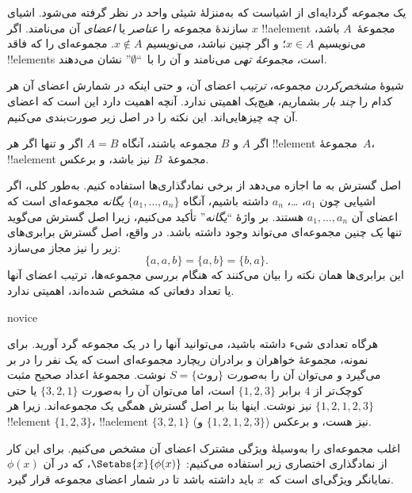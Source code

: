 \documentclass[../../../include/open-logic-section]{subfiles}
\begin{document}

یک \emph{مجموعه} گردایه‌ای از اشیاست که {به‌منزلهٔ} شیئی واحد در
نظر گرفته می‌شود. اشیای سازندهٔ مجموعه را \emph{عناصر} یا
\emph{اعضای} آن می‌نامند. اگر $x$ !!a{element} مجموعهٔ~$A$ باشد،
می‌نویسیم $x \in A$؛ و اگر چنین نباشد، می‌نویسیم $x \notin A$.
مجموعه‌ای را که فاقد !!{element}s است، \emph{مجموعهٔ تهی} می‌نامند و
آن را با~``$\emptyset$'' نشان می‌دهند.

\begin{explain}
شیوهٔ \emph{مشخص‌کردن} مجموعه، \emph{ترتیب} اعضای آن، و حتی
اینکه در شمارش اعضای آن هر کدام را \emph{چند بار} بشماریم،
هیچ‌یک اهمیتی ندارد. آنچه اهمیت دارد این است که اعضای آن چه
چیزهایی‌اند. این نکته را در اصل زیر صورت‌بندی می‌کنیم.
\end{explain}

\begin{defn}
  اگر $A$ و $B$ مجموعه باشند، آنگاه $A = B$ اگر و تنها اگر
  هر !!{element} مجموعهٔ~$A$، !!a{element} مجموعهٔ~$B$ نیز باشد، و
  برعکس.
\end{defn}

اصل گسترش به ما اجازه می‌دهد از برخی نمادگذاری‌ها استفاده کنیم.
به‌طور کلی، اگر اشیایی چون $a_{1}$، \dots، $a_{n}$ داشته باشیم، آنگاه
$\{a_{1}, \dots, a_{n}\}$ \emph{یگانه} مجموعه‌ای است که اعضای آن
$a_1, \ldots, a_n$ هستند. بر واژهٔ ``\emph{یگانه}'' تأکید می‌کنیم،
زیرا اصل گسترش می‌گوید تنها \emph{یک} چنین مجموعه‌ای می‌تواند وجود
داشته باشد. در واقع، اصل گسترش برابری‌های زیر را نیز مجاز می‌سازد:
  \[
    \{a, a, b\} = \{a, b\} = \{b,a\}.
  \]
این برابری‌ها همان نکته را بیان می‌کنند که هنگام بررسی مجموعه‌ها،
ترتیب اعضای آنها یا تعداد دفعاتی که مشخص شده‌اند، اهمیتی ندارد.

\begin{tagblock}{novice}
\begin{ex}
هرگاه تعدادی شیء داشته باشید، می‌توانید آنها را در یک مجموعه گرد آورید.
برای نمونه، مجموعهٔ خواهران و برادران ریچارد مجموعه‌ای است که یک نفر را
در بر می‌گیرد و می‌توان آن را به‌صورت $S=\{\textrm{روث}\}$ نوشت.
مجموعهٔ اعداد صحیح مثبت کوچک‌تر از $4$ برابر $\{1, 2, 3\}$ است، اما
می‌توان آن را به‌صورت $\{3, 2, 1\}$ یا حتی $\{1, 2, 1, 2, 3\}$ نیز نوشت.
اینها بنا بر اصل گسترش همگی یک مجموعه‌اند. زیرا هر !!{element}
$\{1, 2, 3\}$، !!a{element} $\{3, 2, 1\}$ (و $\{1,
2, 1, 2, 3\}$) نیز هست، و برعکس.
\end{ex}
\end{tagblock}

اغلب مجموعه‌ای را به‌وسیلهٔ ویژگی مشترک اعضای آن مشخص می‌کنیم.
برای این کار از نمادگذاری اختصاری زیر استفاده می‌کنیم:
$\Setabs{x}{\phi(x)}$، که در آن $\phi(x)$ نمایانگر ویژگی‌ای است
که~$x$ باید داشته باشد تا در شمار اعضای مجموعه قرار گیرد.
\end{document}
